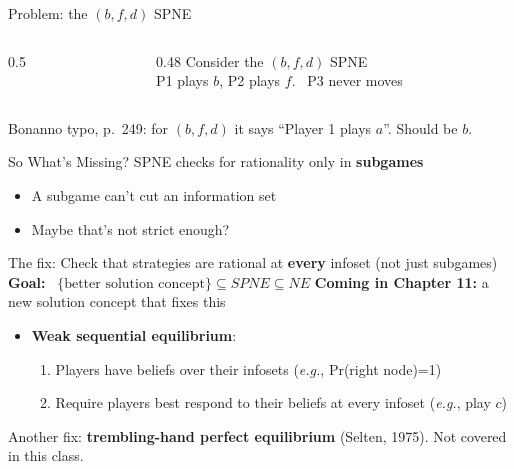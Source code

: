 \begin{frame}{Problem: the $(b,f,d)$ SPNE}
\begin{columns}[c]
\begin{column}{0.5\textwidth}
\centering
\horse
\end{column}
\begin{column}{0.48\textwidth}
Consider the $(b,f,d)$ SPNE\\[4pt]
P1 plays $b$, P2 plays $f$. \ P3 never moves
\bsk
{}
\bsk
{}
\end{column}
\end{columns}
\bsk
{}
\vfill
{\footnotesize Bonanno typo, p.~249: for $(b,f,d)$ it says ``Player 1 plays $a$''. Should be $b$.}
\vspace{-0.2in}
\end{frame}

\begin{frame}{So What's Missing?}
SPNE checks for rationality only in \textbf{subgames}
\begin{itemize}
    \item A subgame can't cut an information set
    \item Maybe that's not strict enough?
\end{itemize}
\bsk
The fix: Check that strategies are rational at \textbf{every} infoset (not just subgames)
\bsk
\textbf{Goal:} \ $\{\text{better solution concept}\}\subseteq SPNE\subseteq NE$
\bsk
\textbf{Coming in Chapter 11:} a new solution concept that fixes this
\begin{itemize}
    \item \textbf{Weak sequential equilibrium}:
    \begin{enumerate}
        \item Players have beliefs over their infosets (\textit{e.g.}, Pr(right node)=1)
        \item Require players best respond to their beliefs at every infoset (\textit{e.g.}, play $c$)
    \end{enumerate} 
\end{itemize}
\vfill
{\footnotesize Another fix: \textbf{trembling-hand perfect equilibrium} (Selten, 1975). Not covered in this class.}
\vspace{-0.2in}
\end{frame}

